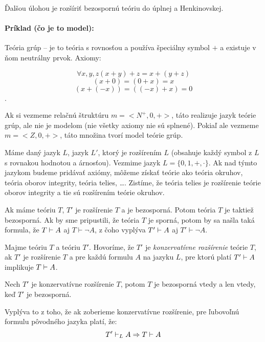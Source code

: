\par Ďalšou úlohou je rozšíriť bezospornú teóriu do úplnej a Henkinovskej.

\paragraph{Príklad (čo je to model):} Teória grúp -- je to teória s rovnosťou a
používa špeciálny symbol $+$ a existuje v ňom neutrálny prvok. Axiomy:

$$\forall x,y,z (x+y)+z = x+(y+z)$$
$$(x+0) = (0+x) = x$$
$$(x+(-x)) = ((-x)+x) = 0$$.

\par Ak si vezmeme relačnú štruktúru $m=<N^+,0,+>$, táto realizuje jazyk teórie
grúp, ale nie je modelom (nie všetky axiomy nie sú splnené). Pokiaľ ale vezmeme
$m=<Z,0,+>$, táto množina tvorí model teórie grúp.  

\par Máme daný jazyk $L$, jazyk $L'$, ktorý je rozšírením $L$ (obsahuje každý
symbol z $L$ s rovnakou hodnotou a árnosťou). Vezmime jazyk $L= \{0, 1, +,
\cdot \}$. Ak nad týmto jazykom budeme pridávať axiómy, môžeme získať teórie ako
teória okruhov, teória oborov integrity, teória telies, \ldots . Zistíme, že
teória telies je rozšírenie teórie oborov integrity a tie sú rozšírením teórie
okruhov. 

\par Ak máme teóriu $T$, $T'$ je rozšírenie $T$ a je bezosporná. Potom teória
$T$ je taktiež bezosporná. Ak by sme pripustili, že teória $T$ je sporná, potom
by sa našla taká formula, že $T \vdash A$ aj $T \vdash \neg A$, z čoho vyplýva
$T' \vdash A$ aj $T' \vdash \neg A$.

\begin{definicia}
    Majme teóriu $T$ a teóriu $T'$. Hovoríme, že $T'$ je
    \emph{konzervatívne rozšírenie} teórie $T$,
    ak $T'$ je rozšírenie $T$ a pre každú formulu $A$ na jazyku $L$,
    pre ktorú platí $T' \vdash A$ implikuje $T \vdash A$.
\end{definicia}    

\begin{lema} 
    Nech $T'$ je konzervatívne rozšírenie $T$, potom $T$ je
    bezosporná vtedy a len vtedy, keď $T'$ je bezosporná.
\end{lema}
\begin{dokaz}
    Vyplýva to z toho, že ak zoberieme konzervatívne rozšírenie,
    pre ľubovoľnú formulu pôvodného jazyka platí, že:
    \begin{equation*}
        T' \vdash_L A \Rightarrow T \vdash A
    \end{equation*}
\end{dokaz}    

